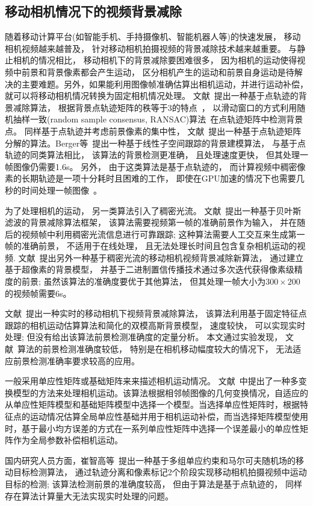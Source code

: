 \subsection{移动相机情况下的视频背景减除}
\label{sec:movingCamera}
随着移动计算平台(如智能手机、手持摄像机、智能机器人等)的快速发展， 移动相机视频越来越普及， 针对移动相机拍摄视频的背景减除技术越来越重要。 与静止相机的情况相比， 移动相机下的背景减除要困难很多， 因为相机的运动使得视频中前景和背景像素都会产生运动， 区分相机产生的运动和前景自身运动是待解决的主要难题。另外，如果能利用图像帧准确估算出相机运动，并进行运动补偿，就可以将移动相机情况转换为固定相机情况处理。
 文献~\cite{iccv2009}提出一种基于点轨迹的背景减除算法， 根据背景点轨迹矩阵的秩等于3的特点~\cite{Tomasi_1992}， 以滑动窗口的方式利用随机抽样一致(random sample consensus, RANSAC)算法~\cite{Ransac}在点轨迹矩阵中检测背景点。 同样基于点轨迹并考虑前景像素的集中性， 文献~\cite{Cui2012}提出一种基于点轨迹矩阵分解的算法。Berger等~\cite{SubspaceTracking}提出一种基于线性子空间跟踪的背景建模算法， 与基于点轨迹的同类算法相比， 该算法的背景检测更准确， 且处理速度更快， 但其处理一帧图像仍需要1.6s。 另外， 由于这类算法是基于点轨迹的， 而计算视频中稠密像素的长期轨迹是一项十分耗时且困难的工作， 即使在GPU加速的情况下也需要几秒的时间处理一帧图像~\cite{ECCV10DensePonintTrajectories}。\par

为了处理相机的运动， 另一类算法引入了稠密光流。 文献~\cite{kwak2011Generalized}提出一种基于贝叶斯滤波的背景减除算法框架， 该算法需要视频第一帧的准确前景作为输入， 并在随后的视频帧中利用稠密光流信息进行可靠跟踪; 这种算法需要人工交互来生成第一帧的准确前景， 不适用于在线处理， 且无法处理长时间且包含复杂相机运动的视频. 文献~\cite{gbsuperpixel}提出另外一种基于稠密光流的移动相机视频背景减除新算法， 通过建立基于超像素的背景模型， 并基于二进制置信传播技术通过多次迭代获得像素级精度的前景; 虽然该算法的准确度要优于其他算法， 但其处理一帧大小为$300\times200$的视频帧需要6s。\par
文献~\cite{5.8s}提出一种实时的移动相机下视频背景减除算法， 该算法利用基于固定特征点跟踪的相机运动估算算法和简化的双模高斯背景模型， 速度较快， 可以实现实时处理; 但没有给出该算法前景检测准确度的定量分析。 本文通过实验发现， 文献~\cite{5.8s}算法的前景检测准确度较低， 特别是在相机移动幅度较大的情况下， 无法适应前景检测准确率要求较高的应用。\par
一般采用单应性矩阵或基础矩阵来来描述相机运动情况。 文献~中提出了一种多变换模型的方法来处理相机运动。该算法根据相邻帧图像的几何变换情况，自适应的从单应性矩阵模型和基础矩阵模型中选择一个模型。当选择单应性矩阵时，根据特征点的运动情况估算全局单应性基础并用于相机运动补偿，而当选择矩阵模型使用时，基于最小均方误差的方式在一系列单应性矩阵中选择一个误差最小的单应性矩阵作为全局参数补偿相机运动。\par
国内研究人员方面，崔智高等~\cite{czg}提出一种基于多组单应约束和马尔可夫随机场的移动目标检测算法， 通过轨迹分离和像素标记2个阶段实现移动相机拍摄视频中运动目标的检测; 该算法检测前景的准确度较高， 但由于算法是基于点轨迹的， 同样存在算法计算量大无法实现实时处理的问题。




